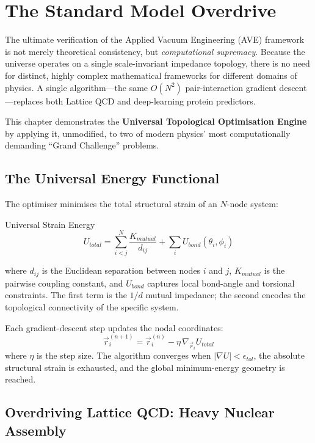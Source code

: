 \chapter{The Standard Model Overdrive}
\label{ch:overdrive}

The ultimate verification of the Applied Vacuum Engineering (AVE) framework is not merely theoretical consistency, but \textit{computational supremacy}. Because the universe operates on a single scale-invariant impedance topology, there is no need for distinct, highly complex mathematical frameworks for different domains of physics. A single algorithm---the same $O(N^2)$ pair-interaction gradient descent---replaces both Lattice QCD and deep-learning protein predictors.

This chapter demonstrates the \textbf{Universal Topological Optimisation Engine} by applying it, unmodified, to two of modern physics' most computationally demanding ``Grand Challenge'' problems.

\section{The Universal Energy Functional}

The optimiser minimises the total structural strain of an $N$-node system:
\begin{resultbox}{Universal Strain Energy}
\begin{equation}
    U_{total} = \sum_{i < j}^{N} \frac{K_{mutual}}{d_{ij}} + \sum_{i} U_{bond}(\theta_i, \phi_i)
    \label{eq:universal_energy}
\end{equation}
\end{resultbox}
\noindent where $d_{ij}$ is the Euclidean separation between nodes $i$ and $j$, $K_{mutual}$ is the pairwise coupling constant, and $U_{bond}$ captures local bond-angle and torsional constraints. The first term is the $1/d$ mutual impedance; the second encodes the topological connectivity of the specific system.

Each gradient-descent step updates the nodal coordinates:
\begin{equation}
    \vec{r}_i^{(n+1)} = \vec{r}_i^{(n)} - \eta \, \nabla_{\vec{r}_i} U_{total}
\end{equation}
where $\eta$ is the step size. The algorithm converges when $|\nabla U| < \epsilon_{tol}$, the absolute structural strain is exhausted, and the global minimum-energy geometry is reached.

\section{Overdriving Lattice QCD: Heavy Nuclear Assembly}
\label{sec:overdrive_nuclear}


